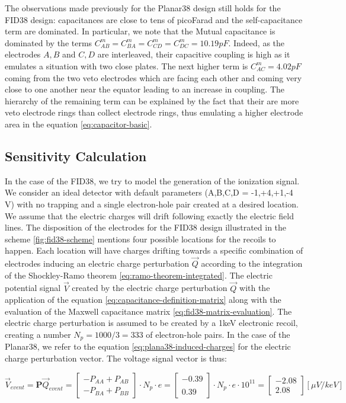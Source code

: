 The observations made previously for the Planar38 design still holds for the FID38 design: capacitances are close to tens of picoFarad and the self-capacitance term are dominated. In particular, we note that the Mutual capacitance is dominated by the terms $C_{AB}^m=C_{BA}^m=C_{CD}^m=C_{DC}^m=10.19pF$. Indeed, as the electrodes $A,B$ and $C,D$ are interleaved, their capacitive coupling is high as it emulates a situation with two close plates. The next higher term is $C_{AC}^m=4.02pF$ coming from the two veto electrodes which are facing each other and coming very close to one another near the equator leading to an increase in coupling. The hierarchy of the remaining term can be explained by the fact that their are more veto electrode rings than collect electrode rings, thus emulating a higher electrode area in the equation \ref{eq:capacitor-basic}.

\subsection{Sensitivity Calculation}

In the case of the FID38, we try to model the generation of the ionization signal. We consider an ideal detector with default parameters (A,B,C,D = -1,+4,+1,-4 V) with no trapping and a single electron-hole pair created at a desired location. We assume that the electric charges will drift following exactly the electric field lines. The disposition of the electrodes for the FID38 design illustrated in the scheme \ref{fig:fid38-scheme} mentions four possible locations for the recoils to happen. Each location will have charges drifting towards a specific combination of electrodes inducing an electric charge perturbation $\vec{Q}$ according to the integration of the Shockley-Ramo theorem \ref{eq:ramo-theorem-integrated}. The electric potential signal $\vec{V}$ created by the electric charge perturbation $\vec{Q}$ with the application of the equation \ref{eq:capacitance-definition-matrix} along with the evaluation of the Maxwell capacitance matrix \ref{eq:fid38-matrix-evaluation}. The electric charge perturbation is assumed to be created by a 1keV electronic recoil, creating a number $N_p = 1000/3 = 333$ of electron-hole pairs.
In the case of the Planar38, we refer to the equation \ref{eq:plana38-induced-charges} for the electric charge perturbation vector. The voltage signal vector is thus:

\begin{equation}
\label{eq:planar38-sensitivity}
\vec{V}_{event} = \bm{P} \vec{Q}_{event} =
\begin{bmatrix}
- P_{AA} + P_{AB} \\ - P_{BA} + P_{BB}
\end{bmatrix}
\cdot N_p \cdot e
= 
\begin{bmatrix}
-0.39 \\  \\ 0.39
\end{bmatrix}
\cdot N_p \cdot e \cdot 10^{11}
= 
\begin{bmatrix}
-2.08 \\ 2.08 
\end{bmatrix}
[\mu V/keV]
\end{equation}

